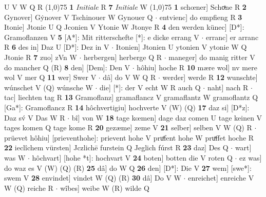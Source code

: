 \documentclass[8pt,a4paper,notitlepage]{article}
\begin{document}
\begin{table}[ht]
\begin{minipage}[t]{0.5\linewidth}
U V W Q R \newline
\line(1,0){75} \newline
\textbf{1} \textit{Initiale} R  \textbf{7} \textit{Initiale} W  \newline
\line(1,0){75} \newline
\textbf{1} schœner] Schoͯne R \textbf{2} Gynover] Gẏnover V Tschinouer W Gynouer Q  $\cdot$ entvienc] do empfieng R \textbf{3} Itonie] Jtonie U Q Jconien V Ytonie W Jtonye R \textbf{4} den werden künec] [D*]: Gramoflanzen V \textbf{5} [A*]: Mit ritterschefte [*]: e dicke errang V  $\cdot$ erranc] er arranc R \textbf{6} des in] Daz U [D*]: Dez in V  $\cdot$ Itonien] Jtonien U ytonien V ytonie W Q Jtonie R \textbf{7} zuo] zVn W  $\cdot$ herbergen] herberge Q R  $\cdot$ maneger] do manig ritter V do mancher Q (R) \textbf{8} den] [Dem]: Den V  $\cdot$ hôhiu] hoche R \textbf{10} mære wol] nv mere wol V mer Q \textbf{11} wer] Swer V  $\cdot$ dâ] do V W Q R  $\cdot$ werder] werde R \textbf{12} wunschte] wúnschet V (Q) wúnsche W  $\cdot$ die] [*]: der V echt W R auch Q  $\cdot$ naht] nach R  $\cdot$ tac] liechten tag R \textbf{13} Gramoflanz] gramaflancz V gramaflantz W gramoflantz Q [Ga*]: Gramoflancz R \textbf{14} hôchvertigiu] hochverte V (W) (Q) \textbf{17} daz si] [D*z]: Daz sv́ V Das W R  $\cdot$ bî] von W \textbf{18} tage kœmen] dage daz comen U tage keinen V tages komen Q tage kome R \textbf{20} gezæme] zeme V \textbf{21} selber] selben V W (Q) R  $\cdot$ prüevet hôhiu] [prieventhohe]: prievent hohe V pruͤfent hohe W pruͯffet hoche R \textbf{22} ieclîchem vürsten] Jczlichē furstein Q Jeglich fúrst R \textbf{23} daz] Des Q  $\cdot$ wart] was W  $\cdot$ hôchvart] [hohe *t]: hochvart V \textbf{24} boten] botten die V roten Q  $\cdot$ ez was] do waz es V (W) (Q) (R) \textbf{25} dâ] do W Q \textbf{26} den] [D*]: Die V \textbf{27} wem] [swe*]: swem V \textbf{28} envindet] vindet W (Q) (R) \textbf{30} dâ] Do V W  $\cdot$ enreichet] enreiche V W (Q) reiche R  $\cdot$ wîbes] weibe W (R) wilde Q \newline
\end{minipage}
\end{table}
\end{document}
